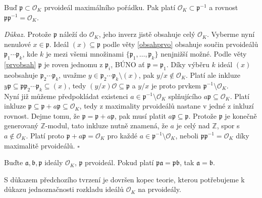 \documentclass [12pt]{report}
\begin{document}
\begin{veta}
Buď $\mathfrak{p} \subset \mathcal{O}_K$ prvoideál maximálního pořádku. Pak platí $\mathcal{O}_K \subset \mathfrak{p}^{-1}$ a rovnost $\mathfrak{p} \mathfrak{p}^{-1} = \mathcal{O}_K$.
\end{veta}
\noindent \textit{Důkaz.} Protože $\mathfrak{p}$ náleží do $\mathcal{O}_K$, jeho inverz jistě obsahuje celý $\mathcal{O}_K$. Vyberme nyní nenulové $x \in \mathfrak{p}$. Ideál $(x) \subseteq \mathfrak{p}$ podle věty \ref{obsahprvo} obsahuje součin prvoideálů $\mathfrak{p}_1 \cdots \mathfrak{p}_k$, kde $k$ je mezi všemi množinami $\lbrace \mathfrak{p}_1,\dots,\mathfrak{p}_k \rbrace$ nenjnižší možné. Podle věty \ref{prvobsah} $\mathfrak{p}$ je roven jednomu z $\mathfrak{p}_i$, BÚNO ať $\mathfrak{p} = \mathfrak{p}_1$. Díky výběru $k$ ideál $(x)$ neobsahuje $\mathfrak{p}_2 \cdots \mathfrak{p}_k$, uvažme $y \in \mathfrak{p}_2 \cdots \mathfrak{p}_k \setminus (x)$, pak $y/x \not\in \mathcal{O}_K$. Platí ale inkluze $y \mathfrak{p} \subseteq \mathfrak{p} \mathfrak{p}_2 \cdots \mathfrak{p}_k \subseteq (x)$, tedy $(y/x) \mathcal{O} \subseteq \mathfrak{p}$ a $y/x$ je proto prvkem $\mathfrak{p}^{-1} \setminus \mathcal{O}_K$.\\

Nyní již můžeme předpokládat existenci $a \in \mathfrak{p}^{-1} \setminus \mathcal{O}_K$ splňujícího $a \mathfrak{p} \subseteq \mathcal{O}_K$. Platí inkluze $\mathfrak{p} \subseteq \mathfrak{p}+a \mathfrak{p} \subseteq \mathcal{O}_K$, tedy z maximality prvoideálů nastane v jedné z inkluzí rovnost. Dejme tomu, že $\mathfrak{p} = \mathfrak{p} + a \mathfrak{p}$, pak musí platit $a \mathfrak{p} \subseteq \mathfrak{p}$. Protože $\mathfrak{p}$ je konečně generovaný $\mathbb{Z}$-modul, tato inkluze nutně znamená, že $a$ je celý nad $\mathbb{Z}$, spor s $a \not\in \mathcal{O}_K$. Platí proto $\mathfrak{p} + a \mathfrak{p} = \mathcal{O}_K$ pro každé $a \in \mathfrak{p}^{-1} \setminus \mathcal{O}_K$, neboli $\mathfrak{p} \mathfrak{p}^{-1} = \mathcal{O}_K$ díky maximalitě prvoideálů. \hfill $\square$\\

\begin{dusledek}\label{cancel}
Buďte $\mathfrak{a},\mathfrak{b},\mathfrak{p}$ ideály $\mathcal{O}_K$, $\mathfrak{p}$ prvoideál. Pokud platí $\mathfrak{p} \mathfrak{a} = \mathfrak{p} \mathfrak{b}$, tak $\mathfrak{a} = \mathfrak{b}$.
\end{dusledek}

S důkazem předchozího tvrzení je dovršen kopec teorie, kterou potřebujeme k důkazu jednoznačnosti rozkladu ideálů $\mathcal{O}_K$ na prvoideály.
\end{document}
